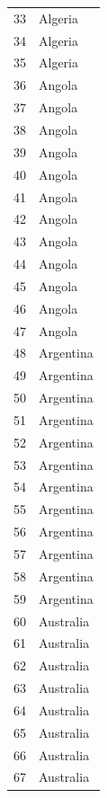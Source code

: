 \documentclass[
  letterpaper,
  DIV=11,
  numbers=noendperiod]{scrreprt}
\begin{document}
\begin{tabular}{ll}
33   &                   Algeria \\
34   &                   Algeria \\
35   &                   Algeria \\
36   &                    Angola \\
37   &                    Angola \\
38   &                    Angola \\
39   &                    Angola \\
40   &                    Angola \\
41   &                    Angola \\
42   &                    Angola \\
43   &                    Angola \\
44   &                    Angola \\
45   &                    Angola \\
46   &                    Angola \\
47   &                    Angola \\
48   &                 Argentina \\
49   &                 Argentina \\
50   &                 Argentina \\
51   &                 Argentina \\
52   &                 Argentina \\
53   &                 Argentina \\
54   &                 Argentina \\
55   &                 Argentina \\
56   &                 Argentina \\
57   &                 Argentina \\
58   &                 Argentina \\
59   &                 Argentina \\
60   &                 Australia \\
61   &                 Australia \\
62   &                 Australia \\
63   &                 Australia \\
64   &                 Australia \\
65   &                 Australia \\
66   &                 Australia \\
67   &                 Australia \\

\end{tabular}
\end{document}
